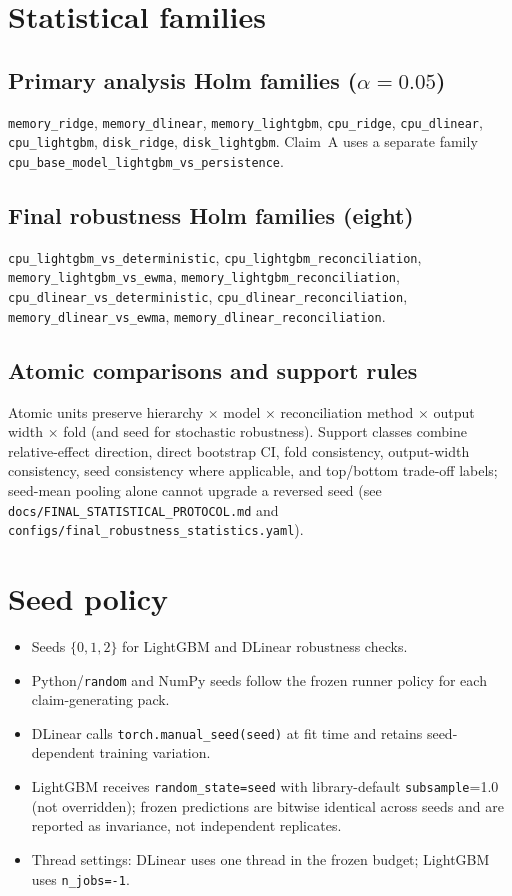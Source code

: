 \documentclass[a4paper,fleqn]{cas-dc}
\begin{document}
\section{Statistical families}
\subsection*{Primary analysis Holm families ($\alpha=0.05$)}
\texttt{memory\_ridge}, \texttt{memory\_dlinear}, \texttt{memory\_lightgbm},
\texttt{cpu\_ridge}, \texttt{cpu\_dlinear}, \texttt{cpu\_lightgbm},
\texttt{disk\_ridge}, \texttt{disk\_lightgbm}.
Claim~A uses a separate family
\texttt{cpu\_base\_model\_lightgbm\_vs\_persistence}.

\subsection*{Final robustness Holm families (eight)}
\texttt{cpu\_lightgbm\_vs\_deterministic},
\texttt{cpu\_lightgbm\_reconciliation},
\texttt{memory\_lightgbm\_vs\_ewma},
\texttt{memory\_lightgbm\_reconciliation},
\texttt{cpu\_dlinear\_vs\_deterministic},
\texttt{cpu\_dlinear\_reconciliation},
\texttt{memory\_dlinear\_vs\_ewma},
\texttt{memory\_dlinear\_reconciliation}.

\subsection*{Atomic comparisons and support rules}
Atomic units preserve hierarchy $\times$ model $\times$ reconciliation method
$\times$ output width $\times$ fold (and seed for stochastic robustness).
Support classes combine relative-effect direction, direct bootstrap CI, fold
consistency, output-width consistency, seed consistency where applicable, and
top/bottom trade-off labels; seed-mean pooling alone cannot upgrade a reversed
seed (see \texttt{docs/FINAL\_STATISTICAL\_PROTOCOL.md} and
\texttt{configs/final\_robustness\_statistics.yaml}).

\section{Seed policy}
\begin{itemize}
  \item Seeds $\{0,1,2\}$ for LightGBM and DLinear robustness checks.
  \item Python/\texttt{random} and NumPy seeds follow the frozen runner policy
    for each claim-generating pack.
  \item DLinear calls \texttt{torch.manual\_seed(seed)} at fit time and retains
    seed-dependent training variation.
  \item LightGBM receives \texttt{random\_state=seed} with library-default
    \texttt{subsample}=1.0 (not overridden); frozen predictions are bitwise
    identical across seeds and are reported as invariance, not independent
    replicates.
  \item Thread settings: DLinear uses one thread in the frozen budget; LightGBM
    uses \texttt{n\_jobs=-1}.
\end{itemize}
\end{document}
